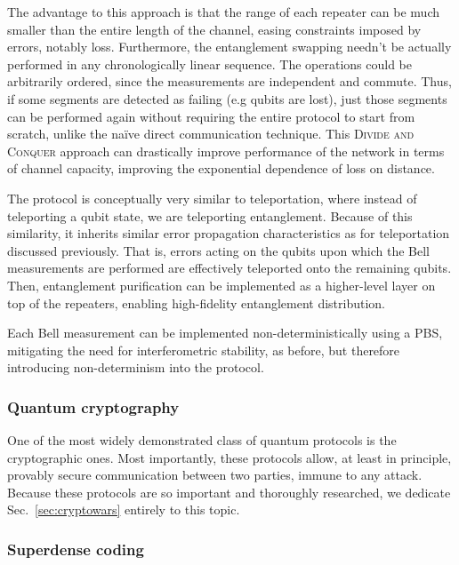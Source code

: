 The advantage to this approach is that the range of each repeater can be much smaller than the entire length of the channel, easing constraints imposed by errors, notably loss. Furthermore, the entanglement swapping needn't be actually performed in any chronologically linear sequence. The operations could be arbitrarily ordered, since the measurements are independent and commute. Thus, if some segments are detected as failing (e.g qubits are lost), just those segments can be performed again without requiring the entire protocol to start from scratch, unlike the na{\" i}ve direct communication technique. This \textsc{Divide and Conquer} approach can drastically improve performance of the network in terms of channel capacity, improving the exponential dependence of loss on distance. 

The protocol is conceptually very similar to teleportation, where instead of teleporting a qubit state, we are teleporting entanglement. Because of this similarity, it inherits similar error propagation characteristics as for teleportation discussed previously. That is, errors acting on the qubits upon which the Bell measurements are performed are effectively teleported onto the remaining qubits. Then, entanglement purification can be implemented as a higher-level layer on top of the repeaters, enabling high-fidelity entanglement distribution.

Each Bell measurement can be implemented non-deterministically using a PBS, mitigating the need for interferometric stability, as before, but therefore introducing non-determinism into the protocol.

%
%

\subsubsection{Quantum cryptography}\label{sec:QKD_prot}

One of the most widely demonstrated class of quantum protocols is the cryptographic ones. Most importantly, these protocols allow, at least in principle, provably secure communication between two parties, immune to any attack. Because these protocols are so important and thoroughly researched, we dedicate  Sec.~\ref{sec:cryptowars} entirely to this topic.

%
%

\subsubsection{Superdense coding}\label{sec:superdense}

